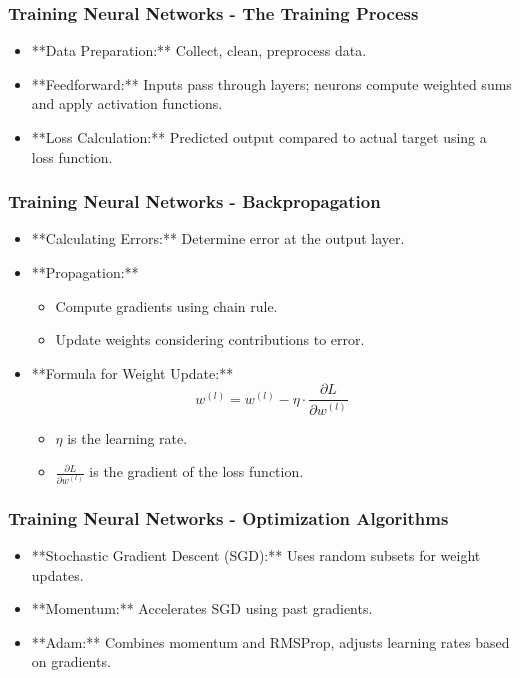 \documentclass[aspectratio=169]{beamer}
\begin{document}
\begin{frame}[fragile]
    \frametitle{Training Neural Networks - The Training Process}
    \begin{itemize}
        \item **Data Preparation:** Collect, clean, preprocess data.
        \item **Feedforward:** Inputs pass through layers; neurons compute weighted sums and apply activation functions.
        \item **Loss Calculation:** Predicted output compared to actual target using a loss function.
    \end{itemize}
\end{frame}

\begin{frame}[fragile]
    \frametitle{Training Neural Networks - Backpropagation}
    \begin{itemize}
        \item **Calculating Errors:** Determine error at the output layer.
        \item **Propagation:** 
        \begin{itemize}
            \item Compute gradients using chain rule.
            \item Update weights considering contributions to error.
        \end{itemize}
        \item **Formula for Weight Update:**
        \begin{equation}
            w^{(l)} = w^{(l)} - \eta \cdot \frac{\partial L}{\partial w^{(l)}}
        \end{equation}
        \begin{itemize}
            \item \( \eta \) is the learning rate.
            \item \( \frac{\partial L}{\partial w^{(l)}} \) is the gradient of the loss function.
        \end{itemize}
    \end{itemize}
\end{frame}

\begin{frame}[fragile]
    \frametitle{Training Neural Networks - Optimization Algorithms}
    \begin{itemize}
        \item **Stochastic Gradient Descent (SGD):** Uses random subsets for weight updates.
        \item **Momentum:** Accelerates SGD using past gradients.
        \item **Adam:** Combines momentum and RMSProp, adjusts learning rates based on gradients.
    \end{itemize}
\end{frame}
\end{document}

